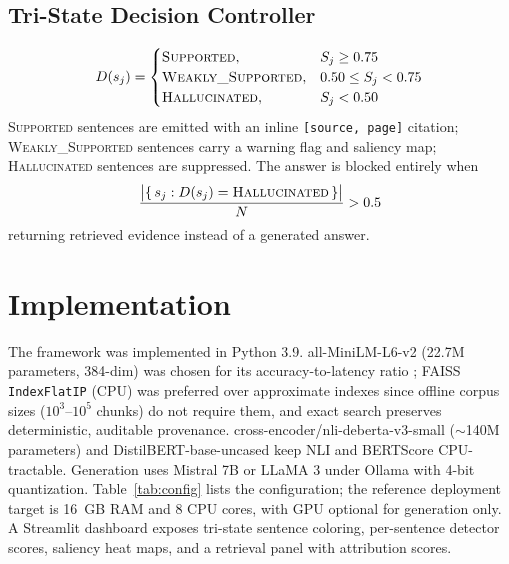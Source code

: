 \documentclass[conference]{IEEEtran}
\begin{document}
\subsection{Tri-State Decision Controller}
\begin{equation}
D(s_j) =
\begin{cases}
\textsc{Supported}, & S_j \geq 0.75 \\
\textsc{Weakly\_Supported}, & 0.50 \leq S_j < 0.75 \\
\textsc{Hallucinated}, & S_j < 0.50
\end{cases}
\label{eq:tristate}
\end{equation}
\textsc{Supported} sentences are emitted with an inline \texttt{[source, page]} citation; \textsc{Weakly\_Supported} sentences carry a warning flag and saliency map; \textsc{Hallucinated} sentences are suppressed. The answer is blocked entirely when
\begin{equation}
\frac{\big|\{\, s_j : D(s_j) = \textsc{Hallucinated} \,\}\big|}{N} > 0.5
\label{eq:block}
\end{equation}
returning retrieved evidence instead of a generated answer.

\section{Implementation}
The framework was implemented in Python 3.9. all-MiniLM-L6-v2 (22.7M parameters, 384-dim) was chosen for its accuracy-to-latency ratio \cite{muennighoff2022mteb}; FAISS \texttt{IndexFlatIP} (CPU) \cite{johnson2019faiss} was preferred over approximate indexes since offline corpus sizes ($10^3$--$10^5$ chunks) do not require them, and exact search preserves deterministic, auditable provenance. cross-encoder/nli-deberta-v3-small ($\sim$140M parameters) \cite{he2023debertav3} and DistilBERT-base-uncased \cite{sanh2019distilbert} keep NLI and BERTScore CPU-tractable. Generation uses Mistral 7B or LLaMA 3 under Ollama with 4-bit quantization. Table~\ref{tab:config} lists the configuration; the reference deployment target is 16~GB RAM and 8 CPU cores, with GPU optional for generation only. A Streamlit dashboard exposes tri-state sentence coloring, per-sentence detector scores, saliency heat maps, and a retrieval panel with attribution scores.
\end{document}
